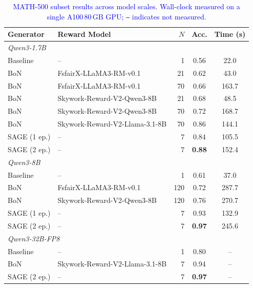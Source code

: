 \documentclass{article}
\theoremstyle{plain}
\theoremstyle{definition}
\theoremstyle{remark}
\newcommand{\method}{SAGE} %
\begin{document}
\begin{table}[h]
\caption{\textcolor{blue}{MATH-500 subset results across model scales. Wall-clock measured on a single A100\,80\,GB GPU; \texttt{--} indicates not measured.}}
\label{tab:small-large-models}
\vskip 0.1in
\centering
\begin{small}
\begin{sc}
\begin{tabular*}{\linewidth}{@{\extracolsep{\fill}} l l r c c @{}}
\toprule
Generator & Reward Model & $N$ & Acc. & Time (s) \\
\midrule
\multicolumn{5}{l}{\textit{Qwen3-1.7B}} \\
Baseline          & --                                    &   1 & 0.56          & 22.0  \\
BoN               & FsfairX-LLaMA3-RM-v0.1               &  21 & 0.62          & 43.0  \\
BoN               & FsfairX-LLaMA3-RM-v0.1               &  70 & 0.66          & 163.7 \\
BoN               & Skywork-Reward-V2-Qwen3-8B            &  21 & 0.68          & 48.5  \\
BoN               & Skywork-Reward-V2-Qwen3-8B            &  70 & 0.72          & 168.7 \\
BoN               & Skywork-Reward-V2-Llama-3.1-8B        &  70 & 0.86          & 144.1 \\
\method{} (1 ep.) & --                                    &   7 & 0.84          & 105.5 \\
\method{} (2 ep.) & --                                    &   7 & \textbf{0.88} & 152.4 \\
\midrule
\multicolumn{5}{l}{\textit{Qwen3-8B}} \\
Baseline          & --                                    &   1 & 0.61          & 37.0  \\
BoN               & FsfairX-LLaMA3-RM-v0.1               & 120 & 0.72          & 287.7 \\
BoN               & Skywork-Reward-V2-Qwen3-8B            & 120 & 0.76          & 270.7 \\
\method{} (1 ep.) & --                                    &   7 & 0.93          & 132.9 \\
\method{} (2 ep.) & --                                    &   7 & \textbf{0.97} & 245.6 \\
\midrule
\multicolumn{5}{l}{\textit{Qwen3-32B-FP8}} \\
Baseline          & --                                    &   1 & 0.80          & --    \\
BoN               & Skywork-Reward-V2-Llama-3.1-8B        &   7 & 0.94          & --    \\
\method{} (2 ep.) & --                                    &   7 & \textbf{0.97} & --    \\
\bottomrule
\end{tabular*}
\end{sc}
\end{small}
\vskip -0.1in
\end{table}
\end{document}
